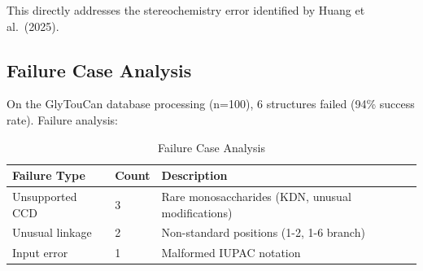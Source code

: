 \documentclass[11pt,a4paper]{article}
\begin{document}
This directly addresses the stereochemistry error identified by Huang et al.\ (2025).

\subsection{Failure Case Analysis}

On the GlyTouCan database processing (n=100), 6 structures failed (94\% success rate). Failure analysis:

\begin{table}[h]
\centering
\caption{Failure Case Analysis}
\begin{tabular}{lll}
\toprule
Failure Type & Count & Description \\
\midrule
Unsupported CCD & 3 & Rare monosaccharides (KDN, unusual modifications) \\
Unusual linkage & 2 & Non-standard positions (1-2, 1-6 branch) \\
Input error & 1 & Malformed IUPAC notation \\
\bottomrule
\end{tabular}
\label{tab:failures}
\end{table}
\end{document}
